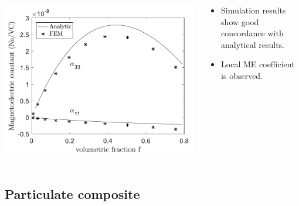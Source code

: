 \documentclass[compress]{beamer}
\begin{document}
\begin{frame}
\begin{columns}[totalwidth=\textwidth]
\end{columns}
\begin{columns}[totalwidth=\textwidth]
   \begin{column}{.40\textwidth}
   \centering
   \includegraphics[width=0.99\textwidth]{Graphic/04_cylinmatalpha.pdf}
   \end{column}
   \begin{column}{.58\textwidth}
   \begin{exampleblock}{}
   \begin{itemize}[label=$\bullet$, font=\small, leftmargin=*]
	\item Simulation results show good concordance with analytical results. 
	\item Local ME coefficient is observed.
	\end{itemize}
	\end{exampleblock}
   \end{column}
\end{columns}
\end{frame}


\subsection{Particulate composite}
\end{document}
